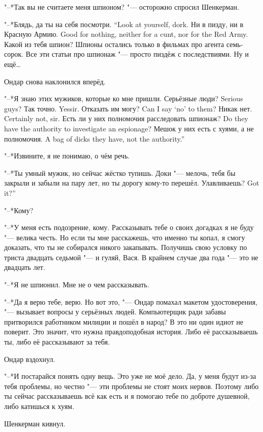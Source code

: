 "--*Так вы не считаете меня шпионом? "--- осторожно спросил Шенкерман.

{"--*Блядь, да ты на себя посмотри.}
{``Look at yourself, dork.}
{Ни в пизду, ни в Красную Армию.}
{Good for nothing, neither for a cunt, nor for the Red Army.}
Какой из тебя шпион?
Шпионы остались только в фильмах про агента семь-сорок.
Все эти статьи про шпионаж "--- просто пиздёж с последствиями.
Ну и ещё\ldots{}

Ондар снова наклонился вперёд.

"--*Я знаю этих мужиков, которые ко мне пришли.
{Серьёзные люди?}
{Serious guys?}
{Так точно.}
{Yessir.}
{Отказать им могу?}
{Can I say `no' to them?}
{Никак нет.}
{Certainly not, sir.}
{Есть ли у них полномочия расследовать шпионаж?}
{Do they have the authority to investigate an espionage?}
{Мешок у них есть с хуями, а не полномочия.}
{A bag of dicks they have, not the authority.''}

"--*Извините, я не понимаю, о чём речь.

"--*Ты умный мужик, но сейчас жёстко тупишь.
Доки "--- мелочь, тебя бы закрыли и забыли на пару лет, но ты дорогу кому-то перешёл.
{Улавливаешь?}
{Got it?''}

"--*Кому?

"--*У меня есть подозрение, кому.
Рассказывать тебе о своих догадках я не буду "--- велика честь.
Но если ты мне расскажешь, что именно ты копал, я смогу доказать, что ты не собирался никого закапывать.
Получишь свою условку по триста двадцать седьмой "--- и гуляй, Вася.
В крайнем случае два года "--- это не двадцать лет.

"--*Я не шпионил.
Мне не о чем рассказывать.

"--*Да я верю тебе, верю.
Но вот это, "--- Ондар помахал макетом удостоверения, "--- вызывает вопросы у серьёзных людей.
Компьютерщик ради забавы притворился работником милиции и пошёл в народ?
В это ни один идиот не поверит.
Это значит, что нужна правдоподобная история.
Либо её рассказываешь ты, либо её рассказывают за тебя.

Ондар вздохнул.

"--*И постарайся понять одну вещь.
Это уже не моё дело.
Да, у меня будут из-за тебя проблемы, но честно "--- эти проблемы не стоят моих нервов.
Поэтому либо ты сейчас рассказываешь всё как есть и я помогаю тебе по доброте душевной, либо катишься к хуям.

Шенкерман кивнул.

